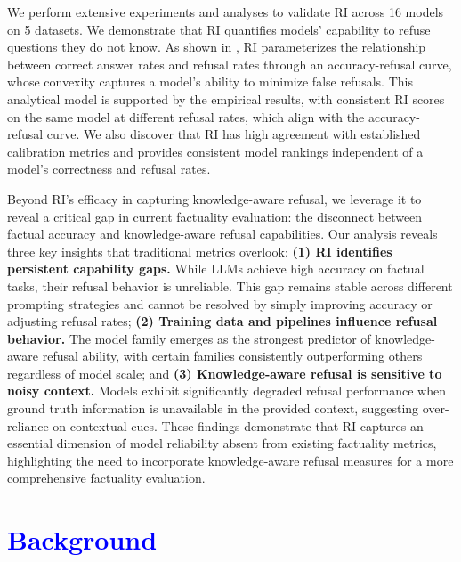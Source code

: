 \documentclass{article} %
\theoremstyle{definition}
\newcommand{\wigglyblue}[1]{\textcolor{blue}{#1}}
\begin{document}
We perform extensive experiments and analyses to validate RI across 16 models on 5 datasets. 
We demonstrate that RI quantifies models' capability to refuse questions they do not know. 
As shown in , RI parameterizes the relationship between correct answer rates and refusal rates through an accuracy-refusal curve, whose convexity captures a model's ability to minimize false refusals.
This analytical model is supported by the empirical results, with consistent RI scores on the same model at different refusal rates, which align with the accuracy-refusal curve.
We also discover that RI has high agreement with established calibration metrics and provides consistent model rankings independent of a model's correctness and refusal rates. 

Beyond RI's efficacy in capturing knowledge-aware refusal, we leverage it to reveal a critical gap in current factuality evaluation: the disconnect between factual accuracy and knowledge-aware refusal capabilities. Our analysis reveals three key insights that traditional metrics overlook:
\textbf{(1) RI identifies persistent capability gaps.} While LLMs achieve high accuracy on factual tasks, their refusal behavior is unreliable. This gap remains stable across different prompting strategies and cannot be resolved by simply improving accuracy or adjusting refusal rates;
\textbf{(2) Training data and pipelines influence refusal behavior.} The model family emerges as the strongest predictor of knowledge-aware refusal ability, with certain families consistently outperforming others regardless of model scale; and
\textbf{(3) Knowledge-aware refusal is sensitive to noisy context.} Models exhibit significantly degraded refusal performance when ground truth information is unavailable in the provided context, suggesting over-reliance on contextual cues.
These findings demonstrate that RI captures an essential dimension of model reliability absent from existing factuality metrics, highlighting the need to incorporate knowledge-aware refusal measures for a more comprehensive factuality evaluation.

\vspace{-0.7em}
\section{\wigglyblue{Background}}
\vspace{-0.7em}
\label{sec:bg}
\end{document}
